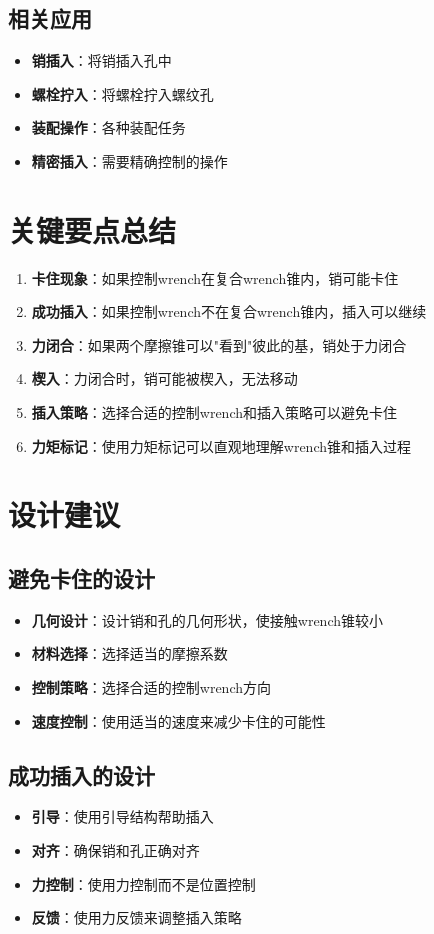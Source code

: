 \documentclass[12pt,a4paper]{article}
\begin{document}
\subsection{相关应用}

\begin{itemize}
    \item \textbf{销插入}：将销插入孔中
    \item \textbf{螺栓拧入}：将螺栓拧入螺纹孔
    \item \textbf{装配操作}：各种装配任务
    \item \textbf{精密插入}：需要精确控制的操作
\end{itemize}

\section{关键要点总结}

\begin{enumerate}
    \item \textbf{卡住现象}：如果控制wrench在复合wrench锥内，销可能卡住
    
    \item \textbf{成功插入}：如果控制wrench不在复合wrench锥内，插入可以继续
    
    \item \textbf{力闭合}：如果两个摩擦锥可以"看到"彼此的基，销处于力闭合
    
    \item \textbf{楔入}：力闭合时，销可能被楔入，无法移动
    
    \item \textbf{插入策略}：选择合适的控制wrench和插入策略可以避免卡住
    
    \item \textbf{力矩标记}：使用力矩标记可以直观地理解wrench锥和插入过程
\end{enumerate}

\section{设计建议}

\subsection{避免卡住的设计}

\begin{itemize}
    \item \textbf{几何设计}：设计销和孔的几何形状，使接触wrench锥较小
    \item \textbf{材料选择}：选择适当的摩擦系数
    \item \textbf{控制策略}：选择合适的控制wrench方向
    \item \textbf{速度控制}：使用适当的速度来减少卡住的可能性
\end{itemize}

\subsection{成功插入的设计}

\begin{itemize}
    \item \textbf{引导}：使用引导结构帮助插入
    \item \textbf{对齐}：确保销和孔正确对齐
    \item \textbf{力控制}：使用力控制而不是位置控制
    \item \textbf{反馈}：使用力反馈来调整插入策略
\end{itemize}
\end{document}
